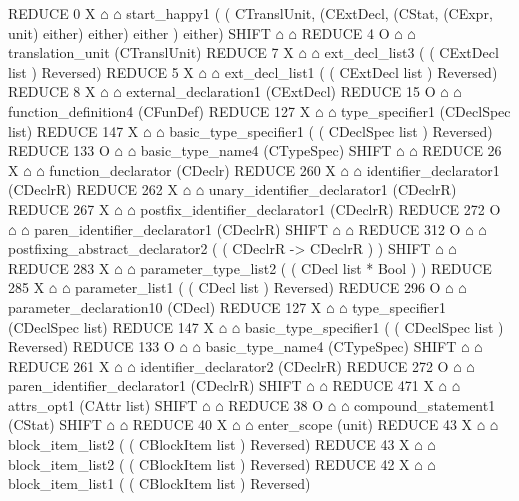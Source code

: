 \begin{isabellebody}
\begin{isamarkuptext}
\begin{isar}
REDUCE 0 X $\house$ $\house$ start_happy1  ( ( CTranslUnit, (CExtDecl, (CStat, (CExpr, unit) either) either) either )  either) 
 SHIFT $\house$ $\house$ 
 REDUCE 4 O $\house$ $\house$ translation_unit  (CTranslUnit) 
  REDUCE 7 X $\house$ $\house$ ext_decl_list3  ( ( CExtDecl list )  Reversed) 
   REDUCE 5 X $\house$ $\house$ ext_decl_list1  ( ( CExtDecl list )  Reversed) 
   REDUCE 8 X $\house$ $\house$ external_declaration1  (CExtDecl) 
    REDUCE 15 O $\house$ $\house$ function_definition4  (CFunDef) 
     REDUCE 127 X $\house$ $\house$ type_specifier1  (CDeclSpec list) 
      REDUCE 147 X $\house$ $\house$ basic_type_specifier1  ( ( CDeclSpec list )  Reversed) 
       REDUCE 133 O $\house$ $\house$ basic_type_name4  (CTypeSpec) 
        SHIFT $\house$ $\house$ 
     REDUCE 26 X $\house$ $\house$ function_declarator  (CDeclr) 
      REDUCE 260 X $\house$ $\house$ identifier_declarator1  (CDeclrR) 
       REDUCE 262 X $\house$ $\house$ unary_identifier_declarator1  (CDeclrR) 
        REDUCE 267 X $\house$ $\house$ postfix_identifier_declarator1  (CDeclrR) 
         REDUCE 272 O $\house$ $\house$ paren_identifier_declarator1  (CDeclrR) 
          SHIFT $\house$ $\house$ 
         REDUCE 312 O $\house$ $\house$ postfixing_abstract_declarator2  ( ( CDeclrR -> CDeclrR ) ) 
          SHIFT $\house$ $\house$ 
          REDUCE 283 X $\house$ $\house$ parameter_type_list2  ( ( CDecl list * Bool ) ) 
           REDUCE 285 X $\house$ $\house$ parameter_list1  ( ( CDecl list )  Reversed) 
            REDUCE 296 O $\house$ $\house$ parameter_declaration10  (CDecl) 
             REDUCE 127 X $\house$ $\house$ type_specifier1  (CDeclSpec list) 
              REDUCE 147 X $\house$ $\house$ basic_type_specifier1  ( ( CDeclSpec list )  Reversed) 
               REDUCE 133 O $\house$ $\house$ basic_type_name4  (CTypeSpec) 
                SHIFT $\house$ $\house$ 
             REDUCE 261 X $\house$ $\house$ identifier_declarator2  (CDeclrR) 
              REDUCE 272 O $\house$ $\house$ paren_identifier_declarator1  (CDeclrR) 
               SHIFT $\house$ $\house$ 
             REDUCE 471 X $\house$ $\house$ attrs_opt1  (CAttr list) 
          SHIFT $\house$ $\house$ 
     REDUCE 38 O $\house$ $\house$ compound_statement1  (CStat) 
      SHIFT $\house$ $\house$ 
      REDUCE 40 X $\house$ $\house$ enter_scope  (unit) 
      REDUCE 43 X $\house$ $\house$ block_item_list2  ( ( CBlockItem list )  Reversed) 
       REDUCE 43 X $\house$ $\house$ block_item_list2  ( ( CBlockItem list )  Reversed) 
        REDUCE 42 X $\house$ $\house$ block_item_list1  ( ( CBlockItem list )  Reversed) 

\end{isar}
\end{isamarkuptext}
\end{isabellebody}
